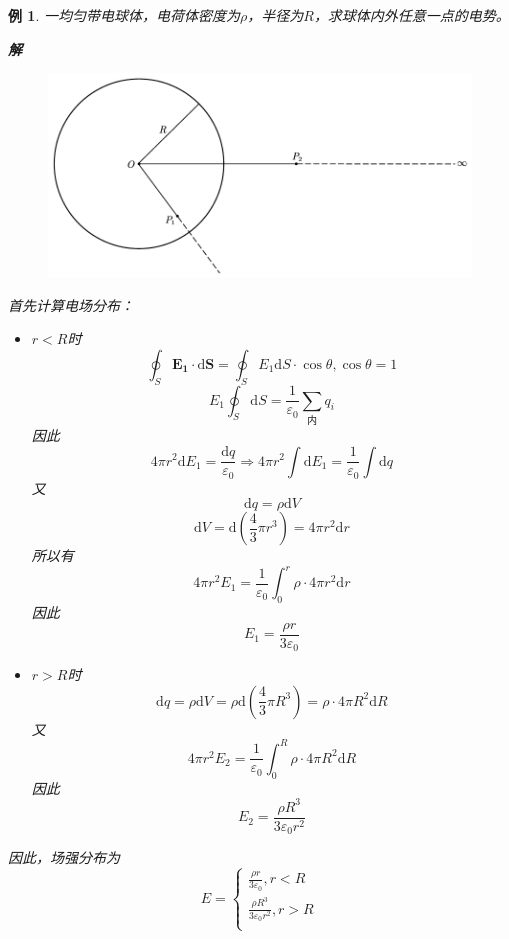 \documentclass[12pt, a4paper, twoside]{ctexbook}
\newtheorem{example}[theorem]{例}
\begin{document}
\begin{example}
    一均匀带电球体，电荷体密度为$\rho$，半径为$R$，求球体内外任意一点的电势。

    \noindent\textbf{解}
    \begin{figure}[H]
        \centerline{\includegraphics[scale=0.8]{CH09EX05.pdf}}
    \end{figure}
    {\sonti 首先计算电场分布}：
    \begin{itemize}
        \item $r<R$时
        $$
        \oint_S \boldsymbol{E_1}\cdot\mathrm{d}\boldsymbol{S}=\oint_S E_1\mathrm{d}S\cdot\cos\theta,\cos\theta=1
        $$
        $$
        E_1\oint_S\mathrm{d}S=\frac{1}{\varepsilon_0}\sum_{\text{内}}q_i
        $$
        因此
        $$
        4\pi r^2\mathrm{d}E_1=\frac{\mathrm{d}q}{\varepsilon_0} \Rightarrow 4\pi r^2\int\mathrm{d}E_1=\frac{1}{\varepsilon_0}\int\mathrm{d}q
        $$
        又
        $$
        \mathrm{d}q=\rho\mathrm{d}V
        $$
        $$
        \mathrm{d}V=\mathrm{d}\left(\frac{4}{3}\pi r^3\right)=4\pi r^2\mathrm{d}r
        $$
        所以有
        $$
        4\pi r^2E_1=\frac{1}{\varepsilon_0}\int_{0}^{r}\rho\cdot4\pi r^2\mathrm{d}r
        $$
        因此
        $$
        E_1=\frac{\rho r}{3\varepsilon_0}
        $$
        \item $r>R$时
        $$
        \mathrm{d}q=\rho\mathrm{d}V=\rho\mathrm{d}\left(\frac{4}{3}\pi R^3\right)=\rho\cdot4\pi R^2\mathrm{d}R
        $$
        又
        $$
        4\pi r^2E_2=\frac{1}{\varepsilon_0}\int_{0}^{R}\rho\cdot4\pi R^2\mathrm{d}R
        $$
        因此
        $$
        E_2=\frac{\rho R^3}{3\varepsilon_0r^2}
        $$
    \end{itemize}
    
    因此，场强分布为
    $$
    E=\left\{ \begin{array}{l}
        \frac{\rho r}{3\varepsilon_0},r<R\\
        \frac{\rho R^3}{3\varepsilon_0r^2},r>R\\
    \end{array} \right. 
    $$


\end{example}
\end{document}
